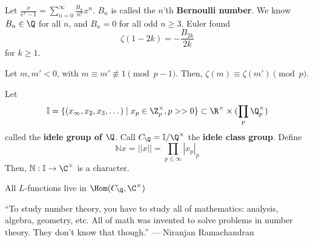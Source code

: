 \begin{defn}
    Let $\frac{x}{e^x-1}=\sum_{n=0}^\infty \frac{B_n}{n!}x^n$. $B_n$ is called the $n$'th \textbf{Bernoulli number}. We know $B_n \in \Q$ for all $n$, and $B_n=0$ for all odd $n \geq 3$. Euler found
    $$\zeta(1-2k) = -\frac{B_{2k}}{2k}$$
    for $k\geq 1$.
\end{defn}

\begin{thm}
    Let $m,m' < 0$, with $m \equiv m' \not \equiv 1 \pmod {p-1}$. Then, $\zeta(m) \equiv \zeta(m') \pmod p$.
\end{thm}

\begin{defn}
    Let
    $$\mathbb I = \{ (x_\infty,x_2,x_3,\dots) \mid x_p \in \Z_p^\times,p>>0\} \subset \R^\times \times (\prod_p \Q_p^\times)$$
    called the \textbf{idele group of $\Q$}. Call $C_\Q = \mathbb I / \Q^\times$ the \textbf{idele class group}. Define
    $$\mathbb Nx = ||x|| = \prod_{p \leq \infty}|x_p|_p$$
    Then, $\mathbb N : \mathbb I \to \C^\times$ is a character.
\end{defn}

\begin{thm}
    All $L$-functions live in $\Hom(C_\Q, \C^\times)$
\end{thm}

``To study number theory, you have to study all of mathematics: analysis, algebra, geometry, etc. All of math was invented to solve problems in number theory. They don't know that though.'' --- Niranjan Ramachandran
